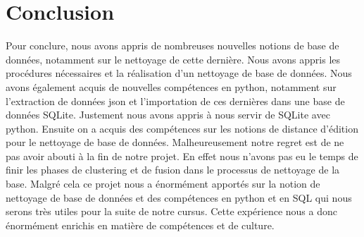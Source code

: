 \documentclass[12pt, a4paper]{article}
\begin{document}
\section{Conclusion}
Pour conclure, nous avons appris de nombreuses nouvelles notions de base de données, notamment sur le nettoyage de cette dernière. Nous avons appris les procédures nécessaires et la réalisation d'un nettoyage de base de données. Nous avons également acquis de nouvelles compétences en python, notamment sur l'extraction de données json et l'importation de ces dernières dans une base de données SQLite. Justement nous avons appris à nous servir de SQLite avec python. Ensuite on a acquis des compétences sur les notions de distance d'édition pour le nettoyage de base de données. Malheureusement notre regret est de ne pas avoir abouti à la fin de notre projet. En effet nous n'avons pas eu le temps de finir les phases de clustering et de fusion dans le processus de nettoyage de la base. Malgré cela ce projet nous a énormément apportés sur la notion de nettoyage de base de données et des compétences en python et en SQL qui nous serons très utiles pour la suite de notre cursus. Cette expérience nous a donc énormément enrichis en matière de compétences et de culture. 




\end{document}

